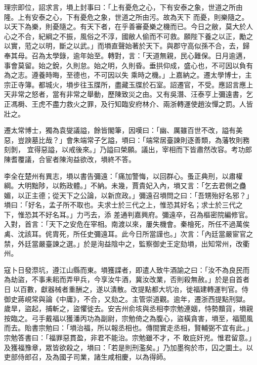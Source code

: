 \begin{pinyinscope}
 理宗即位，詔求言，塤上封事曰：「上有憂危之心，下有安泰之象，世道之所由隆。上有安泰之心，下有憂危之象，世道之所由污。故為天下
 而憂，則樂隨之。以天下為樂，則憂隨之。有天下者，在乎善審憂樂之機而已。今日之敝，莫大於人心之不合，紀綱之不振，風俗之不淳，國敝人偷而不可救。願陛下養之以正，勵之以實，蒞之以明，斷之以武。」而塤直聲始著於天下。與郡守高似孫不合，去，歸奉其母。召為太學錄，逾年始至。轉對，言：「天道無親，民心難保。日月逾邁，事會莫留。始之銳，久則怠。始之明，久則昏。垂拱仰成，盛心也，不可因以負有為之志。遵養時晦，至德也，不可因以失
 乘時之機。」上嘉納之。遷太學博士，主宗正寺簿。都城火，塤步往玉牒所，盡藏玉牒於石室。詔遷官，不受。應詔言應上天非常之怒者，當有非常之舉動，歷陳致災之由。又有吳潛、汪泰亨上彌遠書，乞正馮榯、王虎不盡力救火之罪，及行知臨安府林介、兩浙轉運使趙汝憚之罰。人皆壯之。



 遷太常博士，獨為袁燮議謚，餘皆閣筆，因嘆曰：「幽、厲雖百世不改，謚有美惡，豈諛墓比哉？」會朱端常子乞謚，塤曰：「端常居臺諫則逐善類，為藩牧則務刻剝，
 宜得惡謚，以戒後來。」乃謚曰榮願。議出，宰相而下皆肅然改容。考功郎陳耆覆議，合宦者陳洵益欲改，塤終不答。



 李全在楚州有異志，塤以書告彌遠：「痛加警悔，以回群心。蚤正典刑，以肅權綱。大明黜陟，以飭政體。」不納。未幾，賈貴妃入內，塤又言：「乞去君側之蠱媚，以正主德；從天下之公論，以新庶政。」彌遠召塤問之曰：「吾甥殆好名邪？」塤曰：「好名，孟子所不取也。夫求士於三代之上，惟恐其好名；求士於三代之下，惟恐其不好名耳。」力丐去，添
 差通判嘉興府。彌遠卒，召為樞密院編修官。入對，首言：「天下之安危在宰相。南渡以來，屢失機會。秦檜死，所任不過萬俟禼、沈該耳。侂胄死，所任史彌遠耳。此今日所當謹也。」次言：「內廷當嚴宦官之禁，外廷當嚴臺諫之選。」於是洵益陰中之，監察御史王定劾塤，出知常州，改衢州。



 寇卜日發漈坑，遵江山縣而東。塤獲諜者，即遣人致牛酒諭之曰：「汝不為良民而為劫盜，不事耒耜而弄甲兵，今享汝牛酒，冀汝改業，否則殺無赦。」於是自首者日
 以百數，獻器械者重酬之，遂以潰散。改提點都大坑冶，徙福建轉運判官。侍御史蔣峴常與論《中庸》，不合，又劾之。主管崇道觀。逾年，遷浙西提點刑獄。歲旱，盜起，捕斬之，盜懼徙去。安吉州俞垓與丞相李宗勉連姻，恃勢黷貨，塤親按臨之。弓手戴福以獲潘丙功為副尉，宗勉倚之為腹心，盜橫貪害，塤至，福聞風而去。貽書宗勉曰：「塤治福，所以報丞相也。傳間實走丞相，賢輔弼不宜有此。」宗勉答書曰：「福罪惡貫盈，非君不能治。宗勉雖不才，不
 敢庇奸兇。惟君留意。」及獲福豫章，眾皆欲殺之，塤曰：「若是則刑濫矣。」乃加墨徇於市，囚之圜土。以吏部侍郎召，及為國子司業，諸生咸相慶，以為得師。




\end{pinyinscope}
